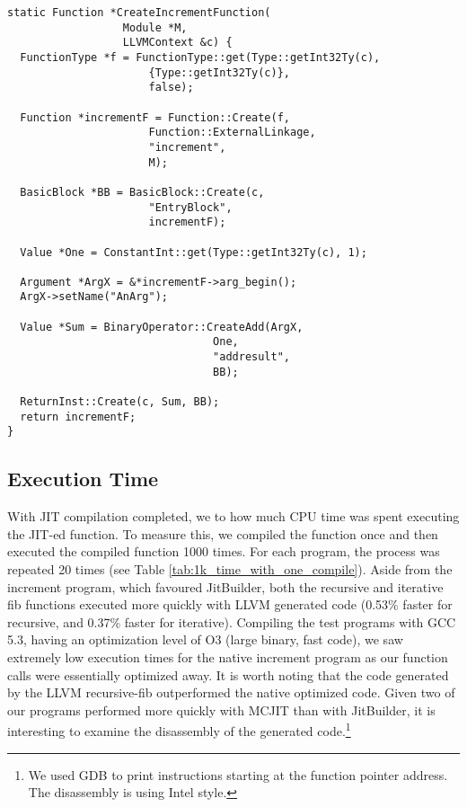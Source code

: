 \begin{lstlisting}[float,floatplacement=H,
  caption={Generating MCJIT IR for the increment program.},
  label=lst:llvm_increment]
static Function *CreateIncrementFunction(
                  Module *M, 
                  LLVMContext &c) {
  FunctionType *f = FunctionType::get(Type::getInt32Ty(c), 
                      {Type::getInt32Ty(c)}, 
                      false);
  
  Function *incrementF = Function::Create(f, 
                      Function::ExternalLinkage, 
                      "increment", 
                      M);

  BasicBlock *BB = BasicBlock::Create(c, 
                      "EntryBlock", 
                      incrementF);
  
  Value *One = ConstantInt::get(Type::getInt32Ty(c), 1);
  
  Argument *ArgX = &*incrementF->arg_begin(); 
  ArgX->setName("AnArg");

  Value *Sum = BinaryOperator::CreateAdd(ArgX, 
                                One,
                                "addresult", 
                                BB);

  ReturnInst::Create(c, Sum, BB);
  return incrementF;
}
\end{lstlisting}

\subsection{Execution Time}
With JIT compilation completed, we to how much CPU time was spent executing the JIT-ed function.
To measure this, we compiled the function once and then executed the compiled function 1000 times.
For each program, the process was repeated 20 times (see Table \ref{tab:1k_time_with_one_compile}).
Aside from the increment program, which favoured JitBuilder, both the recursive and iterative fib functions executed more quickly with LLVM generated code (0.53\% faster for recursive, and 0.37\% faster for iterative).
Compiling the test programs with GCC 5.3, having an optimization level of O3 (large binary, fast code), we saw extremely low execution times for the native increment program as our function calls were essentially optimized away.
It is worth noting that the code generated by the LLVM recursive-fib outperformed the native optimized code.
Given two of our programs performed more quickly with MCJIT than with JitBuilder, it is interesting to examine the disassembly of the generated code.\footnote{We used GDB to print instructions starting at the function pointer address. The disassembly is using Intel style.}

